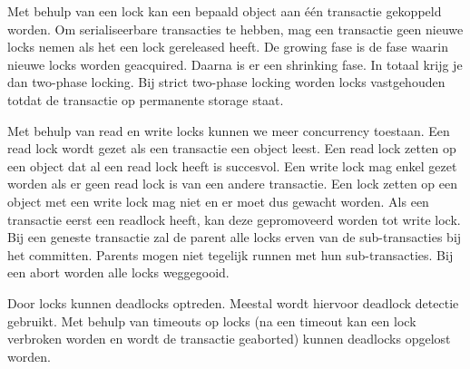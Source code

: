 \documentclass[../samenvatting.tex]{subfiles}
\begin{document}
Met behulp van een lock kan een bepaald object aan één transactie gekoppeld worden. Om serialiseerbare transacties te hebben, mag een transactie geen nieuwe locks nemen als het een lock gereleased heeft. De growing fase is de fase waarin nieuwe locks worden geacquired. Daarna is er een shrinking fase. In totaal krijg je dan two-phase locking. Bij strict two-phase locking worden locks vastgehouden totdat de transactie op permanente storage staat.

Met behulp van read en write locks kunnen we meer concurrency toestaan. Een read lock wordt gezet als een transactie een object leest. Een read lock zetten op een object dat al een read lock heeft is succesvol. Een write lock mag enkel gezet worden als er geen read lock is van een andere transactie. Een lock zetten op een object met een write lock mag niet en er moet dus gewacht worden. Als een transactie eerst een readlock heeft, kan deze gepromoveerd worden tot write lock. Bij een geneste transactie zal de parent alle locks erven van de sub-transacties bij het committen. Parents mogen niet tegelijk runnen met hun sub-transacties. Bij een abort worden alle locks weggegooid.

Door locks kunnen deadlocks optreden. Meestal wordt hiervoor deadlock detectie gebruikt. Met behulp van timeouts op locks (na een timeout kan een lock verbroken worden en wordt de transactie geaborted) kunnen deadlocks opgelost worden.
\end{document}
